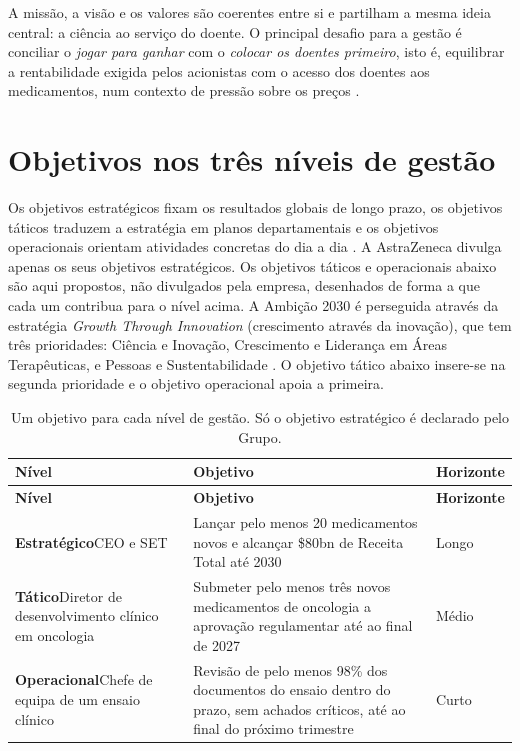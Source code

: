 \begin{analysis}
A missão, a visão e os valores são coerentes entre si e partilham a mesma ideia central: a ciência ao serviço do doente. O principal desafio para a gestão é conciliar o \textit{jogar para ganhar} com o \textit{colocar os doentes primeiro}, isto é, equilibrar a rentabilidade exigida pelos acionistas com o acesso dos doentes aos medicamentos, num contexto de pressão sobre os preços \cite[pp.~32--33]{AR}.
\end{analysis}

\section{Objetivos nos três níveis de gestão}\label{sec:objetivos}
Os objetivos estratégicos fixam os resultados globais de longo prazo, os objetivos táticos traduzem a estratégia em planos departamentais e os objetivos operacionais orientam atividades concretas do dia a dia \cite[pp.~5--9]{PLAN}. A AstraZeneca divulga apenas os seus objetivos estratégicos. Os objetivos táticos e operacionais abaixo são aqui propostos, não divulgados pela empresa, desenhados de forma a que cada um contribua para o nível acima. A Ambição 2030 é perseguida através da estratégia \textit{Growth Through Innovation} (crescimento através da inovação), que tem três prioridades: Ciência e Inovação, Crescimento e Liderança em Áreas Terapêuticas, e Pessoas e Sustentabilidade \cite[p.~10]{AR}. O objetivo tático abaixo insere-se na segunda prioridade e o objetivo operacional apoia a primeira.

\begin{xltabular}{\linewidth}{@{}N{3.1cm}Yl@{}}
\caption{Um objetivo para cada nível de gestão. Só o objetivo estratégico é declarado pelo Grupo.}\label{tab:objetivos}\\*
\toprule
\textbf{Nível} & \textbf{Objetivo} & \textbf{Horizonte} \\*
\midrule
\endfirsthead
\toprule
\textbf{Nível} & \textbf{Objetivo} & \textbf{Horizonte} \\*
\midrule
\endhead
\bottomrule
\endfoot
\textbf{Estratégico}\newline CEO e SET & Lançar pelo menos 20 medicamentos novos e alcançar \$80bn de Receita Total até 2030 \cite[p.~10]{AR} & Longo \\
\textbf{Tático}\newline Diretor de desenvolvimento clínico em oncologia & Submeter pelo menos três novos medicamentos de oncologia a aprovação regulamentar até ao final de 2027 & Médio \\
\textbf{Operacional}\newline Chefe de equipa de um ensaio clínico & Revisão de pelo menos 98\% dos documentos do ensaio dentro do prazo, sem achados críticos, até ao final do próximo trimestre & Curto \\
\end{xltabular}

